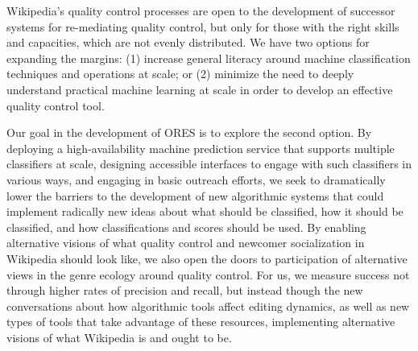 Wikipedia's quality control processes are open to the development of successor systems for re-mediating quality control, but only for those with the right skills and capacities, which are not evenly distributed. We have two options for expanding the margins: (1) increase general literacy around machine classification techniques and operations at scale; or (2) minimize the need to deeply understand practical machine learning at scale in order to develop an effective quality control tool.

Our goal in the development of ORES is to explore the second option.  By deploying a high-availability machine prediction service that supports multiple classifiers at scale, designing accessible interfaces to engage with such classifiers in various ways, and engaging in basic outreach efforts, we seek to dramatically lower the barriers to the development of new algorithmic systems that could implement radically new ideas about what should be classified, how it should be classified, and how classifications and scores should be used. By enabling alternative visions of what quality control and newcomer socialization in Wikipedia should look like, we also open the doors to participation of alternative views in the genre ecology around quality control.  For us, we measure success not through higher rates of precision and recall, but instead though the new conversations about how algorithmic tools affect editing dynamics, as well as new types of tools that take advantage of these resources, implementing alternative visions of what Wikipedia is and ought to be.
